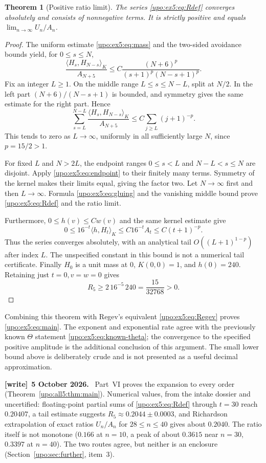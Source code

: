 \documentclass[11pt,letterpaper]{article}
\newtheorem{theorem}{Theorem}[section]
\theoremstyle{remark}\newtheorem{remark}[theorem]{Remark}
\numberwithin{equation}{section}
\newcommand{\pair}[2]{\langle #1,#2\rangle_K}
\newenvironment{writenote}[1][]{\par\smallskip\begingroup\small
 \noindent\textbf{[write]}\if\relax\detokenize{#1}\relax\else~\textbf{#1.}\fi\ }%
 {\par\endgroup\smallskip}
\begin{document}
\begin{theorem}[Positive ratio limit]\label{upo:ex5:thm:ratio}
The series \eqref{upo:ex5:eq:Rdef} converges absolutely and consists of
nonnegative terms. It is strictly positive and equals
$\lim_{n\to\infty}U_n/A_n$.
\end{theorem}
\begin{proof}
The uniform estimate \eqref{upo:ex5:eq:mass} and the two-sided avoidance
bounds yield, for $0\le s\le N$,
\begin{equation}\label{upo:ex5:eq:convolution-bound}
 \frac{\pair{H_s}{H_{N-s}}}{A_{N+5}}
 \le C\frac{(N+6)^p}{(s+1)^p(N-s+1)^p}.
\end{equation}
Fix an integer $L\ge1$. On the middle range $L\le s\le N-L$,
split at $N/2$. In the left part $(N+6)/(N-s+1)$ is bounded,
and symmetry gives the same estimate for the right part. Hence
\begin{equation}\label{upo:ex5:eq:middle}
 \sum_{s=L}^{N-L}
   \frac{\pair{H_s}{H_{N-s}}}{A_{N+5}}
 \le C\sum_{j\ge L}(j+1)^{-p}.
\end{equation}
This tends to zero as $L\to\infty$, uniformly in all sufficiently
large $N$, since $p=15/2>1$.

For fixed $L$ and $N>2L$, the endpoint ranges $0\le s<L$ and
$N-L<s\le N$ are disjoint. Apply \eqref{upo:ex5:eq:endpoint} to their
finitely many terms. Symmetry of the kernel makes their limits
equal, giving the factor two. Let $N\to\infty$ first and then
$L\to\infty$. Formula \eqref{upo:ex5:eq:gluing} and the vanishing middle
bound prove \eqref{upo:ex5:eq:Rdef} and the ratio limit.

Furthermore, $0\le h(v)\le Cw(v)$ and the same kernel estimate give
\[
 0\le16^{-t}\pair h{H_t}
 \le C16^{-t}A_t\le C(t+1)^{-p}.
\]
Thus the series converges absolutely, with an analytical tail
$O((L+1)^{1-p})$ after index $L$. The unspecified constant in this
bound is not a numerical tail certificate.
Finally $H_0$ is a unit mass at $0$, $K(0,0)=1$, and $h(0)=240$.
Retaining just $t=0,v=w=0$ gives
\[
 R_5\ge2\,16^{-5}\,240=\frac{15}{32768}>0.
\]
\end{proof}

Combining this theorem with Regev's equivalent
\eqref{upo:ex5:eq:Regev} proves \eqref{upo:ex5:eq:main}. The exponent and
exponential rate agree with the previously known
$\Theta$ statement \eqref{upo:ex5:eq:known-theta}; the convergence to the
specified positive amplitude is the additional conclusion of this
argument. The small lower bound above is deliberately crude and is
not presented as a useful decimal approximation.
\begin{writenote}[5 October 2026]
Part~VI proves the expansion to every order (Theorem~\ref{upo:all5:thm:main}). Numerical values, from the intake dossier and uncertified: floating-point partial sums of \eqref{upo:ex5:eq:Rdef} through $t=30$ reach $0.20407$, a tail estimate suggests $R_5\approx0.2044\pm0.0003$, and Richardson extrapolation of exact ratios $U_n/A_n$ for $28\le n\le40$ gives about $0.2040$. The ratio itself is not monotone ($0.166$ at $n=10$, a peak of about $0.3615$ near $n=30$, $0.3397$ at $n=40$). The two routes agree, but neither is an enclosure (Section~\ref{upo:sec:further}, item~3).
\end{writenote}
\end{document}
